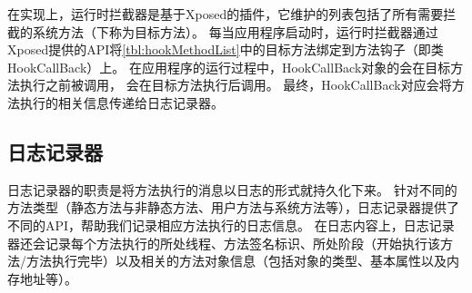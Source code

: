 {\begin{table*}[!ht]
{\begin{threeparttable}[b]
\begin{tabular}{|l|c|}
				\hline
				
				
		 
				
			\end{tabular}
			
			
		\end{threeparttable}
	}
\end{table*}
}

在实现上，运行时拦截器是基于Xposed的插件，它维护的列表包括了所有需要拦截的系统方法（下称为目标方法）。%
每当应用程序启动时，运行时拦截器通过Xposed提供的API将\autoref{tbl:hookMethodList}中的目标方法绑定到方法钩子（即类HookCallBack）上。
在应用程序的运行过程中，HookCallBack对象的会在目标方法执行之前被调用，
会在目标方法执行后调用。
最终，HookCallBack对应会将方法执行的相关信息传递给日志记录器。









\subsection{日志记录器}

日志记录器的职责是将方法执行的消息以日志的形式就持久化下来。
针对不同的方法类型（静态方法与非静态方法、用户方法与系统方法等），日志记录器提供了不同的API，帮助我们记录相应方法执行的日志信息。
在日志内容上，日志记录器还会记录每个方法执行的所处线程、方法签名标识、所处阶段（开始执行该方法/方法执行完毕）以及相关的方法对象信息（包括对象的类型、基本属性以及内存地址等）。


